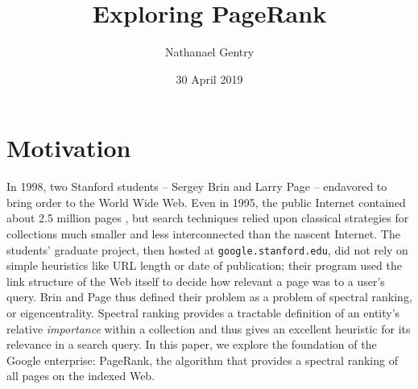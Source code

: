 \documentclass[12pt]{article}
\title{Exploring PageRank}
\author{Nathanael Gentry}
\date{30 April 2019}
\begin{document}
\maketitle



\section{Motivation}
In 1998, two Stanford students -- Sergey Brin and Larry Page -- endavored to
bring order to the World Wide Web. Even in 1995, the public Internet
contained about 2.5 million pages \cite{TotalNumberWebsites}, but search
techniques relied upon classical strategies for collections much smaller and
less interconnected than the nascent Internet. The students’ graduate project,
then hosted at \texttt{google.stanford.edu}, did not rely on simple
heuristics like URL length or date of publication; their program used the link
structure of the Web itself to decide how relevant a page was to a user's query.
Brin and Page thus defined their problem as a problem of spectral ranking, or
eigencentrality. Spectral ranking provides a tractable definition of an entity's
relative \textit{importance} within a collection and thus gives an excellent
heuristic for its relevance in a search query. In this paper, we explore the
foundation of the Google enterprise: PageRank, the algorithm that provides a
spectral ranking of all pages on the indexed Web.
\end{document}
